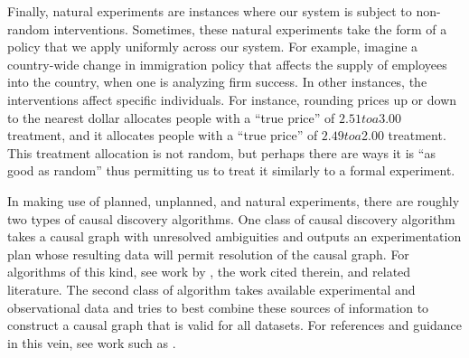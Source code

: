 Finally, natural experiments are instances where our system is subject to non-random interventions.
Sometimes, these natural experiments take the form of a policy that we apply uniformly across our system.
For example, imagine a country-wide change in immigration policy that affects the supply of employees into the country, when one is analyzing firm success.
In other instances, the interventions affect specific individuals.
For instance, rounding prices up or down to the nearest dollar allocates people with a ``true price'' of $2.51 to a $3.00 treatment, and it allocates people with a ``true price'' of $2.49 to a $2.00 treatment.
This treatment allocation is not random, but perhaps there are ways it is ``as good as random'' thus permitting us to treat it similarly to a formal experiment.

In making use of planned, unplanned, and natural experiments, there are roughly two types of causal discovery algorithms.
One class of causal discovery algorithm takes a causal graph with unresolved ambiguities and outputs an experimentation plan whose resulting data will permit resolution of the causal graph.
For algorithms of this kind, see work by \citet{ghassami_2018_budgeted}, the work cited therein, and related literature.
The second class of algorithm takes available experimental and observational data and tries to best combine these sources of information to construct a causal graph that is valid for all datasets.
For references and guidance in this vein, see work such as \citet{tian_2013_causal, peters_2016_causal, ghassami_2017_learning, zhang_2017_causal, kallus_2018_removing}.

